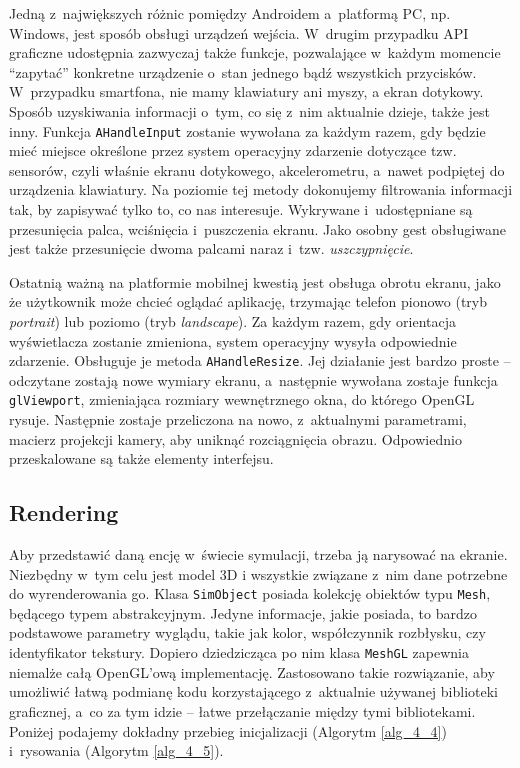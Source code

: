 		Jedną z~największych różnic pomiędzy Androidem a~platformą PC, np. Windows, jest sposób obsługi urządzeń wejścia. W~drugim przypadku API graficzne udostępnia zazwyczaj także funkcje, pozwalające w~każdym momencie ``zapytać'' konkretne urządzenie o~stan jednego bądź wszystkich przycisków. W~przypadku smartfona, nie mamy klawiatury ani myszy, a ekran dotykowy. Sposób uzyskiwania informacji o~tym, co się z~nim aktualnie dzieje, także jest inny. Funkcja \texttt{AHandleInput} zostanie wywołana za każdym razem, gdy będzie mieć miejsce określone przez system operacyjny zdarzenie dotyczące tzw. sensorów, czyli właśnie ekranu dotykowego, akcelerometru, a~nawet podpiętej do urządzenia klawiatury. Na poziomie tej metody dokonujemy filtrowania informacji tak, by zapisywać tylko to, co nas interesuje. Wykrywane i~udostępniane są przesunięcia palca, wciśnięcia i~puszczenia ekranu. Jako osobny gest obsługiwane jest także przesunięcie dwoma palcami naraz i~tzw. \emph{uszczypnięcie}.
		
		Ostatnią ważną na platformie mobilnej kwestią jest obsługa obrotu ekranu, jako że użytkownik może chcieć oglądać aplikację, trzymając telefon pionowo (tryb \emph{portrait}) lub poziomo (tryb \emph{landscape}). Za każdym razem, gdy orientacja wyświetlacza zostanie zmieniona, system operacyjny wysyła odpowiednie zdarzenie. Obsługuje je metoda \texttt{AHandleResize}. Jej działanie jest bardzo proste -- odczytane zostają nowe wymiary ekranu, a~następnie wywołana zostaje funkcja \texttt{glViewport}, zmieniająca rozmiary wewnętrznego okna, do którego OpenGL rysuje. Następnie zostaje przeliczona na nowo, z~aktualnymi parametrami, macierz projekcji kamery, aby uniknąć rozciągnięcia obrazu. Odpowiednio przeskalowane są także elementy interfejsu.
		
		\subsection{Rendering}
		\label{t:praktyka:silnik:render}
		
		
		Aby przedstawić daną encję w~świecie symulacji, trzeba ją narysować na ekranie. Niezbędny w~tym celu jest model 3D i wszystkie związane z~nim dane potrzebne do wyrenderowania go. Klasa \texttt{SimObject} posiada kolekcję obiektów typu \texttt{Mesh}, będącego typem abstrakcyjnym. Jedyne informacje, jakie posiada, to bardzo podstawowe parametry wyglądu, takie jak kolor, współczynnik rozbłysku, czy identyfikator tekstury. Dopiero dziedzicząca po nim klasa \texttt{MeshGL} zapewnia niemalże całą OpenGL'ową implementację. Zastosowano takie rozwiązanie, aby umożliwić łatwą podmianę kodu korzystającego z~aktualnie używanej biblioteki graficznej, a~co za tym idzie -- łatwe przełączanie między tymi bibliotekami. Poniżej podajemy dokładny przebieg inicjalizacji (Algorytm \ref{alg_4_4}) i~rysowania (Algorytm \ref{alg_4_5}).
		\newline
		
